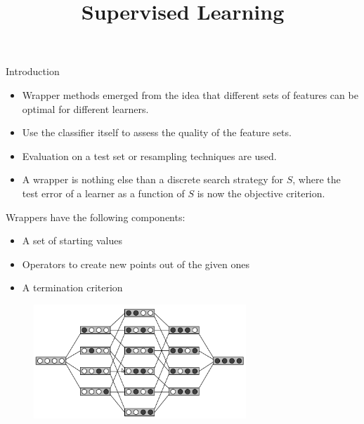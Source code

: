 \documentclass[11pt,compress,t,notes=noshow, xcolor=table]{beamer}
\title{Supervised Learning}
\date{}
\begin{document}

  \begin{vbframe}{Introduction}

    \begin{itemize}
      \item Wrapper methods emerged from the idea that different sets of features can be optimal for different learners.
      \item Use the classifier itself to assess the quality of the feature sets.
      \item Evaluation on a test set or resampling techniques are used.
      \item A wrapper is nothing else than a discrete search strategy for $S$, where the test error of a learner as a function of $S$ is now the objective criterion.

    \end{itemize}


    \framebreak

    Wrappers have the following components:


    \begin{itemize}
      \item A set of starting values
      \item Operators to create new points out of the given ones
      \item A termination criterion
    \end{itemize}


    \begin{figure}
      \includegraphics[width=8cm]{figure_man/varsel_space.png}
    \end{figure}


  \end{vbframe}
  
\end{document}
